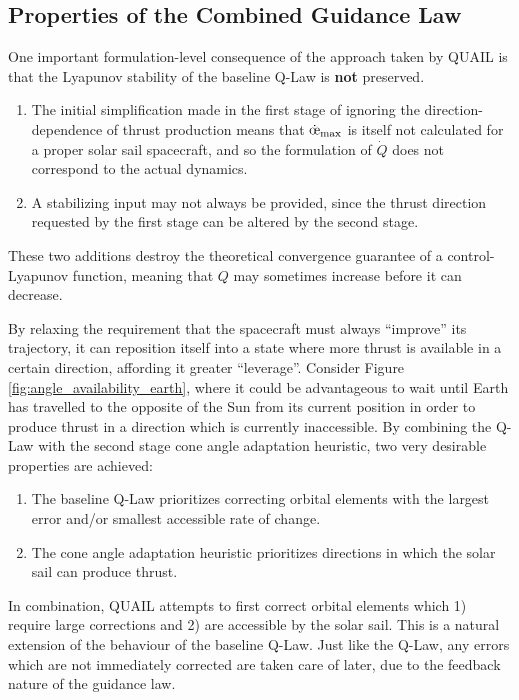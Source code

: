 \subsection{Properties of the Combined Guidance Law}
\label{sec:quail_properties}
One important formulation-level consequence of the approach taken by QUAIL is that the Lyapunov stability of the baseline Q-Law is \textbf{not} preserved.
\begin{enumerate}
    \item The initial simplification made in the first stage of ignoring the direction-dependence of thrust production means that \(\dot{\moe}_{\text{max}}\) is itself not calculated for a proper solar sail spacecraft, and so the formulation of \(\dot{Q}\) does not correspond to the actual dynamics.
    \item A stabilizing input may not always be provided, since the thrust direction requested by the first stage can be altered by the second stage.
\end{enumerate}
These two additions destroy the theoretical convergence guarantee of a control-Lyapunov function, meaning that \(Q\) may sometimes increase before it can decrease.

By relaxing the requirement that the spacecraft must always ``improve'' its trajectory, it can reposition itself into a state where more thrust is available in a certain direction, affording it greater ``leverage''. Consider Figure \ref{fig:angle_availability_earth}, where it could be advantageous to wait until Earth has travelled to the opposite of the Sun from its current position in order to produce thrust in a direction which is currently inaccessible. By combining the Q-Law with the second stage cone angle adaptation heuristic, two very desirable properties are achieved:
\begin{enumerate}
    \item The baseline Q-Law prioritizes correcting orbital elements with the largest error and/or smallest accessible rate of change.
    \item The cone angle adaptation heuristic prioritizes directions in which the solar sail can produce thrust.
\end{enumerate}
In combination, QUAIL attempts to first correct orbital elements which 1) require large corrections and 2) are accessible by the solar sail. This is a natural extension of the behaviour of the baseline Q-Law. Just like the Q-Law, any errors which are not immediately corrected are taken care of later, due to the feedback nature of the guidance law.

